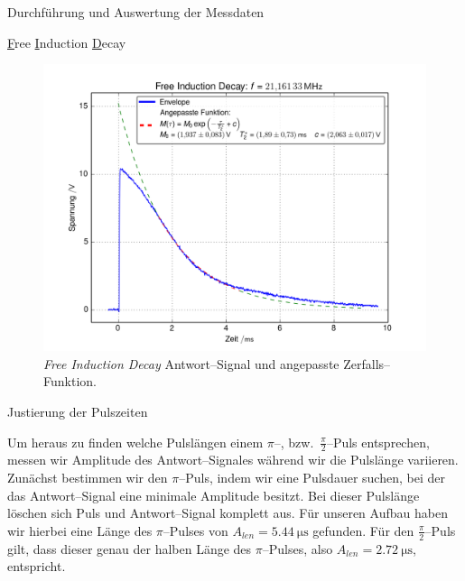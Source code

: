 \documentclass[pdftex, a4paper,11pt, twoside, ngerman]{report}
\begin{document}
\begin{chapter}{Durchführung und Auswertung der Messdaten}
\begin{section}{
        \underline{F}ree \underline{I}nduction \underline{D}ecay}
      \begin{figure}[htb]
        \centering
        \includegraphics[width=.9\textwidth]{Figures/FID_env2.png}
        \caption{\textit{Free Induction Decay} Antwort--Signal und angepasste
          Zerfalls--Funktion.}
        \label{figFIDenv}
      \end{figure}
      
      
      
    \end{section}
    
    
    
    \begin{section}{Justierung der Pulszeiten}
      \label{chpPulszeiten}
      
      Um heraus zu finden welche Pulslängen einem $\pi$--, bzw.\
      $\frac{\pi}{2}$--Puls entsprechen, messen wir Amplitude des
      Antwort--Signales während wir die Pulslänge variieren.
      Zunächst bestimmen wir den $\pi$--Puls, indem wir eine Pulsdauer suchen,
      bei der das Antwort--Signal eine minimale Amplitude besitzt.
      Bei dieser Pulslänge löschen sich Puls und Antwort--Signal komplett aus.
      \todo{Warum?}
      Für unseren Aufbau haben wir hierbei eine Länge des $\pi$--Pulses von
      $A_{len}=\SI{5.44}{\micro\second}$ gefunden.
      Für den $\frac{\pi}{2}$--Puls gilt, dass dieser genau der halben Länge
      des $\pi$--Pulses, also $A_{len}=\SI{2.72}{\micro\second}$, entspricht.
      

\end{section}
\end{chapter}
\end{document}
